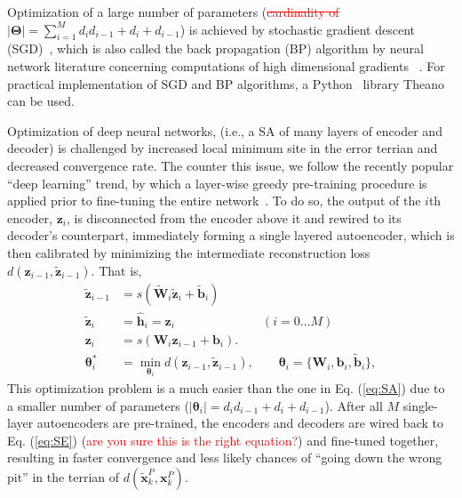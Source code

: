 \documentclass[11pt]{article}
\newcommand{\vv}{\boldsymbol{v}}
\newcommand{\xdel}[1]{\textcolor{red}{\sout{#1}}}
\newcommand{\vecEC}[1]{\boldsymbol{#1}}
\newcommand{\vecDC}[1]{\boldsymbol{\tilde{#1}}}
\newcommand{\WEC}{\vecEC{W}}                   %
\newcommand{\WDC}{\vecDC{W}}                   %
\newcommand{\bEC}{\vecEC{b}}    %
\newcommand{\bDC}{\vecDC{b}}    %
\newcommand{\xEC}{\vecEC{x}}
\newcommand{\xDC}{\vecDC{x}}
\newcommand{\hHT}{\boldsymbol{\hat{h}}}
\newcommand{\zEC}{\vecEC{z}}
\newcommand{\zDC}{\vecDC{z}}
\newcommand{\Par}{\boldsymbol{\Theta}}
\newcommand{\pEC}{\boldsymbol{\theta}}
\begin{document}
Optimization of a large number of parameters (\xdel{cardinality of }$|\Par| = \sum_{i=1}^M{d_i d_{i-1} + d_i + d_{i-1}}$) is achieved by stochastic gradient descent (SGD)~\citep{SGD1, SGD2}, which is also called the back propagation (BP) algorithm by neural network literature concerning computations of high dimensional gradients ~\citep{BP1, BP2, BP3}. For practical implementation of SGD and BP algorithms, a Python~\citep{python1} library Theano~\citep{Theano1} can be used.

Optimization of deep neural networks, (i.e., a SA of many layers of encoder and decoder) is challenged by increased local minimum site in the error terrian and decreased convergence rate. The counter this issue, we follow the recently popular ``deep learning'' trend, by which a layer-wise greedy pre-training procedure is applied prior to fine-tuning the entire network~\citep{DL:DBN1, DL:SDA1}. To do so, the output of the $i$th encoder, $\zEC_i$, is disconnected from the encoder above it and rewired to its decoder's counterpart, immediately forming a single layered autoencoder, which is then calibrated by minimizing the intermediate reconstruction loss $d(\zEC_{i-1}, \zDC_{i-1})$. That is,
\begin{equation}\label{eq:Greedy}
  \begin{split}
    \zDC_{i-1} &= s(\WDC_i \zDC_i + \bDC_i) \\
    \zDC_{i  } &= \hHT_i = \zEC_i \quad \qquad \qquad \qquad (i = 0 \dots M) \\
    \zEC_{i  } &= s(\WEC_i\zEC_{i-1} + \bEC_i). \\
    \pEC_i^* &= \min_{\pEC_i}{d(\zEC_{i-1}, \zDC_{i-1})}, \qquad \pEC_i = \{\WEC_i, \bEC_i, \bDC_i\},
  \end{split}
\end{equation}
This optimization problem is a much easier than the one in Eq. (\ref{eq:SA}) due to a smaller number of parameters ($|\pEC_i|=d_i d_{i-1} + d_i + d_{i-1}$). After all $M$ single-layer autoencoders are pre-trained, the encoders and decoders are wired back to Eq. (\ref{eq:SE}) (\textcolor{red}{are you sure this is the right equation?}) and fine-tuned together, resulting in faster convergence and less likely chances of ``going down the wrong pit'' in the terrian of $d(\xDC_k^P, \xEC_k^P)$.

\end{document}
